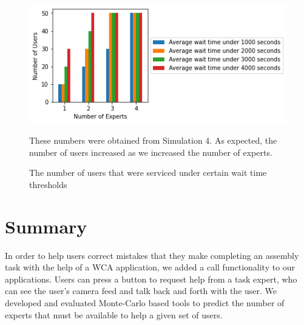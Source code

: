 \begin{figure}[h]
  \includegraphics{figures/montecarlo/vary_num_users2.png}
  \begin{captiontext}
    These numbers were obtained from Simulation 4.
    As expected, the number of users increased as we increased the number of
    experts.
  \end{captiontext}
  \caption{
    The number of users that were serviced under certain wait time thresholds
  }\label{fig:vary_num_users2}
\end{figure}

\section{Summary}

In order to help users correct mistakes that they make completing an assembly
task with the help of a WCA application, we added a call functionality to our
applications.
Users can press a button to request help from a task expert, who can see the
user's camera feed and talk back and forth with the user.
We developed and evaluated Monte-Carlo based tools to predict the number of
experts that must be available to help a given set of users.
